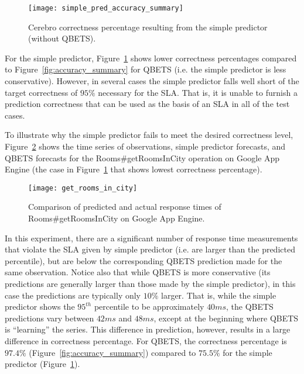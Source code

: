 \begin{figure}
\centering
\texttt{[image: simple\_pred\_accuracy\_summary]}
\caption{Cerebro correctness percentage resulting from the simple predictor (without QBETS).}
\label{fig:simple_pred_accuracy}
\vspace{-0.2in}
\end{figure}

For the simple predictor, Figure~\ref{fig:simple_pred_accuracy} shows lower 
correctness percentages compared to Figure~\ref{fig:accuracy_summary} for
QBETS (i.e. the simple predictor is less conservative).
However, in several cases the simple predictor falls well short of the target 
correctness of $95\%$ necessary for the SLA.  That is, it is unable to furnish
a prediction correctness that can be used as the basis of an
SLA in all of the test cases.

To illustrate why the simple predictor fails to meet the desired correctness 
level, Figure~\ref{fig:get_rooms_in_city} shows the time series of observations, simple predictor forecasts,
and QBETS forecasts for the 
Rooms\#getRoomsInCity operation on Google App
Engine (the case in Figure~\ref{fig:simple_pred_accuracy} that shows 
lowest correctness percentage).
\begin{figure}
\centering
\texttt{[image: get\_rooms\_in\_city]}
\caption{Comparison of predicted and actual response times of Rooms\#getRoomsInCity on Google App Engine.}
\label{fig:get_rooms_in_city}
\vspace{-0.2in}
\end{figure}

In this experiment, there are a significant number of response
time measurements that violate the SLA given by simple predictor (i.e. are
larger than the predicted percentile), but are below the corresponding QBETS
prediction made for the same observation.
Notice also that while QBETS is more conservative (its predictions are
generally larger than those made by the simple predictor), in this case the
predictions are typically only $10\%$ larger.  That is, while the 
simple predictor shows the $95^{th}$ percentile to be approximately $40ms$,
the QBETS predictions vary between $42ms$ and $48ms$, except at the beginning
where QBETS is ``learning'' the series. This difference in prediction,
however, results in a large difference in correctness percentage.  For QBETS,
the correctness percentage is $97.4\%$ (Figure~\ref{fig:accuracy_summary}) compared to
$75.5\%$ for the simple predictor (Figure~\ref{fig:simple_pred_accuracy}).

